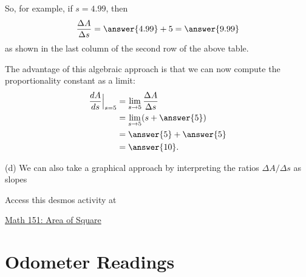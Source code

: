\documentclass{ximera}
\begin{document}
\begin{question}
So, for example, if $s=4.99$, then
\[
\frac{\Delta A}{\Delta s} = \answer{4.99} + 5 = \answer{9.99} 
\]
as shown in the last column of the second row of the above table.

The advantage of this algebraic approach is that we can now compute the proportionality constant as a limit:
\begin{align*}
                    \frac{dA}{ds}\Big|_{s=5} &= \lim_{s\to 5} \frac{\Delta A}{\Delta s} \\
                                                         &=  \lim_{s\to 5} (s+\answer{5}) \\
                                                         &= \answer{5} + \answer{5} \\
                                                           &= \answer{10} .
\end{align*}

(d) We can also take a graphical approach by interpreting the ratios $\Delta A/\Delta s$ as slopes

 
\begin{onlineOnly}
    \begin{center}
\end{center}
\end{onlineOnly}

Access this desmos activity at

\href{https://www.desmos.com/calculator/vz9ud5txva}{Math 151: Area of Square}

\end{question}








\section{Odometer Readings}
\end{document}
